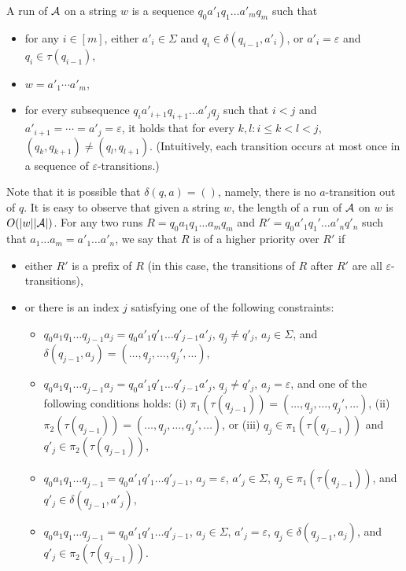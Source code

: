 A  run of $\mathcal{A}$ on a string $w$ is a sequence $q_0 a'_1 q_1 \ldots a'_m q_m$ such that 
\begin{itemize}
\item for any $i \in [m]$, either $a'_i \in \Sigma$ and $q_i \in \delta (q_{i - 1}, a'_i)$, or $a'_i = \varepsilon$ and $q_i \in \tau(q_{i-1})$, %
\item $w = a'_1 \cdots a'_m$,
%
\item for every subsequence $q_i a'_{i+1} q_{i+1} \ldots a'_{j} q_j$ such that  $i < j$ and $a'_{i+1} = \cdots = a'_j = \varepsilon$, it holds that for every $k, l: i \le k < l < j$, $(q_k, q_{k+1}) \neq (q_l, q_{l+1})$.
(Intuitively, each transition occurs at most once in a sequence of $\varepsilon$-transitions.) 
\end{itemize}
Note that it is possible that $\delta(q, a) = ()$, namely, there is no $a$-transition out of $q$. 
It is easy to observe that given a string $w$, the length of a run of $\mathcal{A}$ on $w$ is $O(|w||\mathcal{A}|)$. 
For any two runs $R = q_0 a_1 q_1 \ldots a_m q_m$ and $R' =  q_0 a'_1 q_1' \ldots a'_n q'_n$ such that $a_1 \ldots a_m = a'_1 \ldots a'_n$, we say that $R$ is of a higher priority over $R'$ if 
\begin{itemize}
\item either $R'$ is a prefix of $R$ (in this case, the transitions of $R$ after $R'$ are all $\varepsilon$-transitions), 
%
\item or there is an index $j$ satisfying one of the following constraints:
\begin{itemize}
\item $q_0 a_1 q_1 \ldots q_{j-1} a_j = q_0 a'_1 q'_1 \ldots q'_{j-1} a'_j$, $q_j \neq q'_j$, $a_j \in \Sigma$, and $\delta (q_{j - 1}, a_j) =(\ldots, q_j, \ldots, q_j', \ldots)$,
%
\item $q_0 a_1 q_1 \ldots q_{j-1} a_j = q_0 a'_1 q'_1 \ldots q'_{j-1} a'_j$, $q_j \neq q'_j$, $a_j  = \varepsilon$,  and one of the following conditions holds: (i) $\pi_1(\tau(q_{j - 1})) = (\ldots, q_j, \ldots, q_j', \ldots)$, (ii) $\pi_2(\tau(q_{j - 1})) = (\ldots, q_j, \ldots, q_j', \ldots)$, or (iii) $q_j \in \pi_1(\tau(q_{j - 1}))$ and $q'_j \in \pi_2(\tau(q_{j-1}))$, 
%
\item $q_0 a_1 q_1 \ldots q_{j-1}  = q_0 a'_1 q'_1 \ldots q'_{j-1} $, $a_j  = \varepsilon$, $a'_j  \in \Sigma$, $q_j \in \pi_1(\tau(q_{j - 1}))$, and $q'_j \in \delta(q_{j-1}, a'_j)$, 
%
\item $q_0 a_1 q_1 \ldots q_{j-1}  = q_0 a'_1 q'_1 \ldots q'_{j-1} $, $a_j  \in \Sigma$, $a'_j  = \varepsilon$, $q_j \in \delta(q_{j - 1}, a_j)$, and $q'_j \in \pi_2(\tau(q_{j-1}))$.
\end{itemize}
\end{itemize}
